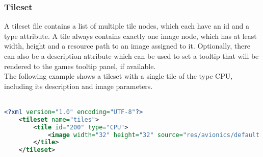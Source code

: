 \subsubsection{Tileset}\label{subsubsec:tileset}
A tileset file contains a list of multiple tile nodes, which each have an id and a type attribute.
A tile always contains exactly one image node, which has at least width, height and a resource path to an image assigned to it.
Optionally, there can also be a description attribute which can be used to set a tooltip that will be rendered to the games tooltip panel, if available.
\\
The following example shows a tileset with a single tile of the type CPU, including its description and image parameters.
\\ \\
\begin{lstlisting}[language=XML,label={lst:tileset-xml}]
    <?xml version="1.0" encoding="UTF-8"?>
    <tileset name="tiles">
        <tile id="200" type="CPU">
            <image width="32" height="32" source="res/avionics/default.png" description="Default CPU Component"/>
        </tile>
    </tileset>
\end{lstlisting}
